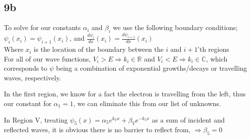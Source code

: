 \documentclass{article}
\begin{document}
\subsection*{9b}
To solve for our constants $\alpha_i$ and $\beta_i$ we use the following boundary conditions;\\

$\psi_i(x_i)=\psi_{i+1}(x_i)$, and $\frac{d\psi_i}{dx}(x_i)=\frac{d\psi_{i+1}}{dx}(x_i)$\\

Where $x_i$ is the location of the boundary between the $i$ and $i+1$'th regions\\

For all of our wave functions, $V_i>E\Rightarrow k_i\in\mathbb{R}$ and $V_i<E\Rightarrow k_i\in\mathbb{C}$, which corresponds to $\psi$ being a combination of exponential growths/decays or travelling waves, respectively. 


In the first region, we know for a fact the electron is travelling from the left, thus our constant for $\alpha_1=1$, we can eliminate this from our list of unknowns.

In Region V, treating $\psi_5(x)=\alpha_5e^{k_Vx}+\beta_Ve^{-k_5x}$ as a sum of incident and reflected waves, it is obvious there is no barrier to reflect from, $\Rightarrow\beta_5=0$\\

\end{document}
